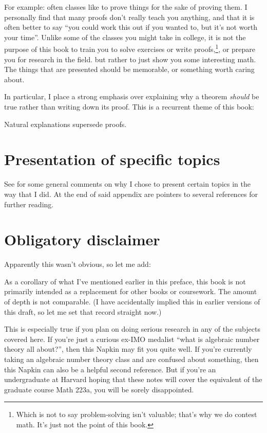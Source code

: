 For example: often classes like to prove things for the sake of proving them.
I personally find that many proofs don't really teach you anything,
and that it is often better to say ``you could work this out if you wanted to,
but it's not worth your time''.
Unlike some of the classes you might take in college,
it is not the purpose of this book to train you to solve exercises
or write proofs,\footnote{%
	Which is not to say problem-solving isn't valuable;
	that's why we do contest math.
	It's just not the point of this book.},
or prepare you for research in the field.
but rather to just show you some interesting math.
The things that are presented should be memorable, or something worth caring about.

In particular, I place a strong emphasis over explaining why a theorem \emph{should}
be true rather than writing down its proof.
This is a recurrent theme of this book:
\begin{moral}
	Natural explanations supersede proofs.
\end{moral}

\section*{Presentation of specific topics}
See  for some general comments on why I chose
to present certain topics in the way that I did.
At the end of said appendix are pointers to
several references for further reading.

\section*{Obligatory disclaimer}
Apparently this wasn't obvious, so let me add:

As a corollary of what I've mentioned earlier in this preface,
this book is not primarily intended as a replacement for other books or coursework.
The amount of depth is not comparable.
(I have accidentally implied this in earlier versions of this draft,
so let me set that record straight now.)

This is especially true if you plan on doing serious research
in any of the subjects covered here.
If you're just a curious ex-IMO medalist ``what is algebraic number theory all about?'',
then this Napkin may fit you quite well.
If you're currently taking an algebraic number theory class and are confused
about something, then this Napkin can also be a helpful second reference.
But if you're an undergraduate at Harvard hoping that these notes
will cover the equivalent of the graduate course Math 223a,
you will be sorely disappointed.

